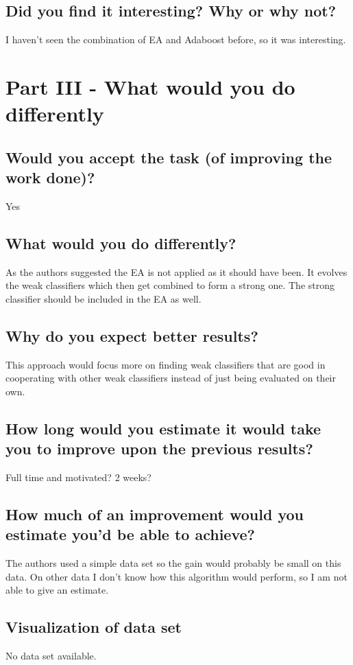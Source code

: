 \documentclass[paper=a4, fontsize=11pt]{scrartcl} %
\numberwithin{equation}{section} %
\numberwithin{figure}{section} %
\numberwithin{table}{section} %
\begin{document}
\subsection{Did you find it interesting? Why or why not?}
I haven't seen the combination of EA and Adaboost before, so it was interesting.

\section{Part III - What would you do differently}
\subsection{Would you accept the task (of improving the work done)?}
Yes
\subsection{What would you do differently?}
As the authors suggested the EA is not applied as it should have been. It evolves the weak classifiers which then get combined to form a strong one. The strong classifier should be included in the EA as well.
\subsection{Why do you expect better results?}
This approach would focus more on finding weak classifiers that are good in cooperating with other weak classifiers instead of just being evaluated on their own.
\subsection{How long would you estimate it would take you to improve upon the previous results?}
Full time and motivated? 2 weeks?
\subsection{How much of an improvement would you estimate you'd be able to achieve?}
The authors used a simple data set so the gain would probably be small on this data. On other data I don't know how this algorithm would perform, so I am not able to give an estimate.
\subsection{Visualization of data set}
No data set available.



\end{document}
